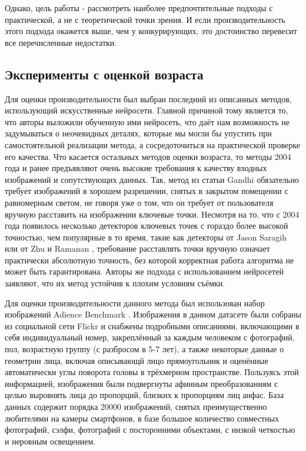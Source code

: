 Однако, цель работы - рассмотреть наиболее предпочтительные подходы с практической, а не с теоретической точки зрения. И если производительность этого подхода окажется выше, чем у конкурирующих, это достоинство перевесит все перечисленные недостатки.

\subsection{Эксперименты с оценкой возраста}

Для оценки производительности был выбран последний из описанных методов, использующий искусственные нейросети. Главной причиной тому является то, что авторы выложили обученную ими нейросеть, что даёт нам возможность не задумываться о неочевидных деталях, которые мы могли бы упустить при самостоятельной реализации метода, а сосредоточиться на практической проверке его качества. Что касается остальных методов оценки возраста, то методы 2004 года и ранее предъявляют очень высокие требования к качеству входных изображений и сопутствующих данных. Так, метод из статьи Gandhi \cite{statya_big} обязательно требует изображений в хорошем разрешении, снятых в закрытом помещении с равномерным светом, не говоря уже о том, что он требует от пользователя вручную расставить на изображении ключевые точки. Несмотря на то, что с 2004 года появилось несколько детекторов ключевых точек с гораздо более высокой точностью, чем популярные в то время, такие как детекторы от Jason Saragih \cite{jsaragih} или от Zhu и Ramanan \cite{zhu_ramanan}, требование расставлять точки вручную означает практически абсолютную точность, без которой корректная работа алгоритма не может быть гарантирована. Авторы же подхода с использованием нейросетей заявляют, что их метод устойчив к плохим условиям съёмки.

Для оценки производительности данного метода был использован набор изображений Adience Benchmark \cite{adience}. Изображения в данном датасете были собраны из социальной сети Flickr и снабжены подробными описаниями, включающими в себя индивидуальный номер, закреплённый за каждым человеком с фотографий, пол, возрастную группу (с разбросом в 5-7 лет), а также некоторые данные о геометрии лица, включая описывающй лицо прямоугольник и оценённые автоматически углы поворота головы в трёхмерном пространстве. Пользуясь этой информацией, изображения были подвергнуты афинным преобразованиям с целью выровнять лица до пропорций, близких к пропорциям лиц анфас. База данных содержит порядка 20000 изображений, снятых преимущественно любителями на камеры смартфонов, в базе большое количество совместных фотографий, сэлфи, фотографий с посторонними объектами, с низкой четкостью и неровным освещением.


